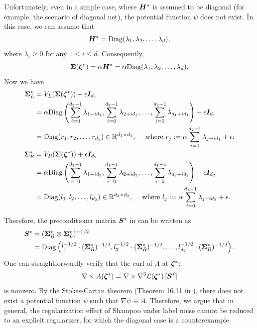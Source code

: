 Unfortunately, even in a simple case, where ${\bm{H}}^*$ is assumed to be diagonal (for example, the scenario of diagonal net), the potential function $\psi$ does not exist. In this case, we can assume that
\begin{align*}
    {\bm{H}}^* = \mathrm{Diag}(\lambda_1,\lambda_2,\dots,\lambda_d),
\end{align*}
where $\lambda_i \ge 0$ for any $1\le i\le d$. Consequently, $${\bm{\Sigma}}({\bm{\zeta}}^*) = \alpha {\bm{H}}^* = \alpha\mathrm{Diag}(\lambda_1,\lambda_2,\dots,\lambda_d).$$ Now we have 
\begin{align*}
    {\bm{\Sigma}}_L^* &= V_L({\bm{\Sigma}}({\bm{\zeta}}^*))+\epsilon {\bm{I}}_{d_1} \\
    &= \alpha\mathrm{Diag}\left(\sum_{i=0}^{d_2-1}\lambda_{1+id_1},\sum_{i=0}^{d_2-1}\lambda_{2+id_1},\dots,\sum_{i=0}^{d_2-1}\lambda_{d_1+id_1}\right) +\epsilon {\bm{I}}_{d_1}\\
    &= \mathrm{Diag}(r_1,r_2,\dots,r_{d_1})\in\mathbb{R}^{d_1 \times d_1},\quad \text{ where } r_j := \alpha\sum_{i=0}^{d_2-1}\lambda_{j+id_1} + \epsilon;\\
{\bm{\Sigma}}_R^* &= V_R({\bm{\Sigma}}({\bm{\zeta}}^*))+\epsilon {\bm{I}}_{d_2} \\
    &= \alpha\mathrm{Diag}\left(\sum_{i=0}^{d_1-1}\lambda_{1+id_2},\sum_{i=0}^{d_1-1}\lambda_{2+id_2},\dots,\sum_{i=0}^{d_1-1}\lambda_{d_2+id_2}\right) +\epsilon {\bm{I}}_{d_2}\\
    &= \mathrm{Diag}(l_1,l_2,\dots,l_{d_2})\in\mathbb{R}^{d_2 \times d_2},\quad \text{ where } l_j := \alpha\sum_{i=0}^{d_1-1}\lambda_{j+id_2} + \epsilon.
\end{align*}

Therefore, the preconditioner matrix ${\bm{S}}^*$ in  can be written as
\begin{align*}
    {\bm{S}}^* &= ({\bm{\Sigma}}_R^* \otimes {\bm{\Sigma}}_L^*)^{-1/2} \\
    &= \mathrm{Diag}\left(l_1^{-1/2}\cdot ({\bm{\Sigma}}_R^*)^{-1/2},l_2^{-1/2}\cdot ({\bm{\Sigma}}_R^*)^{-1/2},\dots,l_{d_2}^{-1/2}\cdot ({\bm{\Sigma}}_R^*)^{-1/2}\right).
\end{align*}
One can straightforwardly verify that the curl of $A$ at ${\bm{\zeta}}^*$: 
$$\nabla \times A({\bm{\zeta}}^*) = \nabla \times \nabla^3 \mathcal{L}({\bm{\zeta}}^*)  \left[{\bm{S}}^*\right]$$
is nonzero. By the Stokes-Cartan theorem  (Theorem 16.11 in \citet{lee2012introduction}), there does not exist a potential function $\psi$ such that $\nabla \psi \equiv A$. Therefore, we argue that in general, the regularization effect of Shampoo under label noise cannot be reduced to an explicit regularizer, for which the diagonal case is a counterexample.
